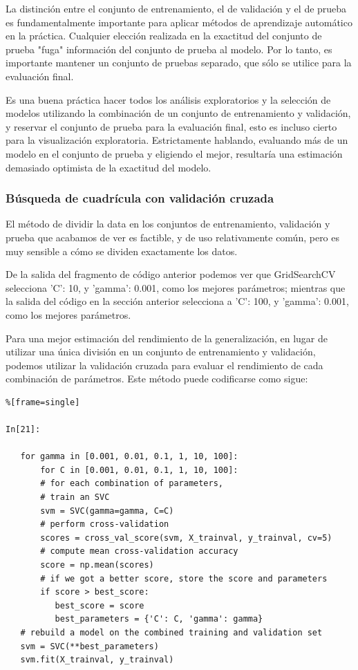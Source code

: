 La distinción entre el conjunto de entrenamiento, el de validación y el de prueba es fundamentalmente importante para aplicar métodos de aprendizaje automático en la práctica. Cualquier elección realizada en la  exactitud del conjunto de prueba  "{}fuga"{}  información del conjunto de prueba al modelo.   Por lo tanto, es importante mantener un conjunto de pruebas separado, que sólo se utilice  para la evaluación final.

 Es una buena práctica hacer todos los análisis exploratorios y la selección de modelos utilizando
la combinación de un conjunto de entrenamiento y validación, y reservar el conjunto de prueba para la evaluación  final, esto es incluso cierto para la visualización exploratoria.  Estrictamente hablando, evaluando más de un modelo en el conjunto de prueba y  eligiendo el mejor, resultaría  una estimación demasiado optimista de la exactitud del modelo.


\subsubsection{Búsqueda de cuadrícula con validación cruzada}

El método de dividir la data en los conjuntos de entrenamiento, validación y   prueba
que acabamos de ver es factible, y de uso relativamente común, pero es muy sensible  a cómo se dividen exactamente los datos. 

De la salida del fragmento de código anterior podemos ver que {\ttfamily GridSearchCV} selecciona {\ttfamily  'C': 10, y   'gamma':  0.001},   como los mejores parámetros;  mientras que la salida del código en la sección anterior selecciona a {\ttfamily 'C': 100,   y   'gamma': 0.001},  como los mejores parámetros.  

Para una mejor estimación del rendimiento de la generalización, en lugar de utilizar una única división en un conjunto de entrenamiento y  validación, podemos utilizar la validación cruzada para evaluar el rendimiento de cada combinación de parámetros. Este método puede codificarse como sigue:


\begin{lstlisting}%[frame=single]

In[21]:

   for gamma in [0.001, 0.01, 0.1, 1, 10, 100]:
       for C in [0.001, 0.01, 0.1, 1, 10, 100]:
       # for each combination of parameters,
       # train an SVC
       svm = SVC(gamma=gamma, C=C)
       # perform cross-validation
       scores = cross_val_score(svm, X_trainval, y_trainval, cv=5)
       # compute mean cross-validation accuracy
       score = np.mean(scores)
       # if we got a better score, store the score and parameters
       if score > best_score:
          best_score = score
          best_parameters = {'C': C, 'gamma': gamma}          
   # rebuild a model on the combined training and validation set
   svm = SVC(**best_parameters)
   svm.fit(X_trainval, y_trainval)

\end{lstlisting}


